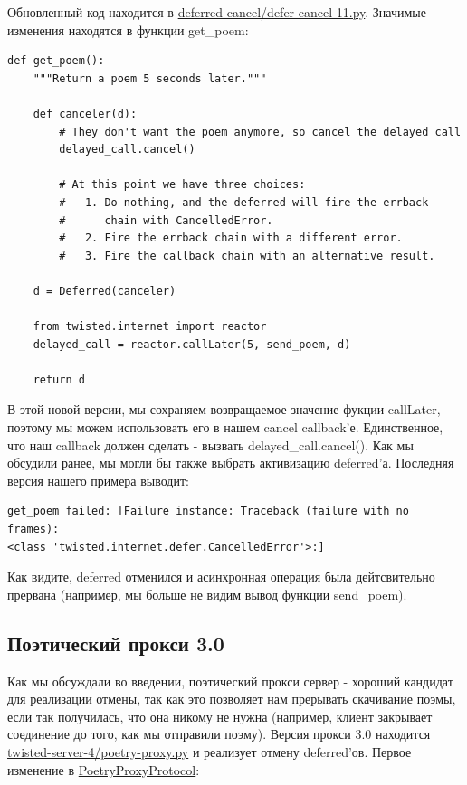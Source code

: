 Обновленный код находится в \href{http://github.com/jdavisp3/twisted-intro/blob/master/deferred-cancel/defer-cancel-11.py#L1}{deferred-cancel/defer-cancel-11.py}. Значимые изменения находятся в 
функции get\_poem:

\begin{scriptsize}\begin{verbatim}
def get_poem():
    """Return a poem 5 seconds later."""

    def canceler(d):
        # They don't want the poem anymore, so cancel the delayed call
        delayed_call.cancel()

        # At this point we have three choices:
        #   1. Do nothing, and the deferred will fire the errback
        #      chain with CancelledError.
        #   2. Fire the errback chain with a different error.
        #   3. Fire the callback chain with an alternative result.

    d = Deferred(canceler)

    from twisted.internet import reactor
    delayed_call = reactor.callLater(5, send_poem, d)

    return d
\end{verbatim}\end{scriptsize}


В этой новой версии, мы сохраняем возвращаемое значение 
фукции callLater, поэтому мы можем использовать его в 
нашем cancel callback'е. Единственное, что наш callback 
должен сделать - вызвать delayed\_call.cancel(). Как мы обсудили 
ранее, мы могли бы также выбрать активизацию deferred'а. 
Последняя версия нашего примера выводит:

\begin{scriptsize}\begin{verbatim}
get_poem failed: [Failure instance: Traceback (failure with no frames): 
<class 'twisted.internet.defer.CancelledError'>:]
\end{verbatim}\end{scriptsize}


Как видите, deferred отменился и асинхронная 
операция была дейтсвительно прервана (например, мы больше 
не видим вывод функции send\_poem).

 
\subsection{Поэтический прокси 3.0}

Как мы обсуждали во введении, поэтический прокси сервер - 
хороший кандидат для реализации отмены, так как это 
позволяет нам прерывать скачивание поэмы, если так получилась, 
что она никому не нужна (например, клиент закрывает соединение 
до того, как мы отправили поэму). Версия прокси 3.0 находится 
\href{http://github.com/jdavisp3/twisted-intro/blob/master/twisted-server-4/poetry-proxy.py#L1}{twisted-server-4/poetry-proxy.py} и реализует отмену deferred'ов. Первое изменение в 
\href{http://github.com/jdavisp3/twisted-intro/blob/master/twisted-server-4/poetry-proxy.py#L52}{PoetryProxyProtocol}:

